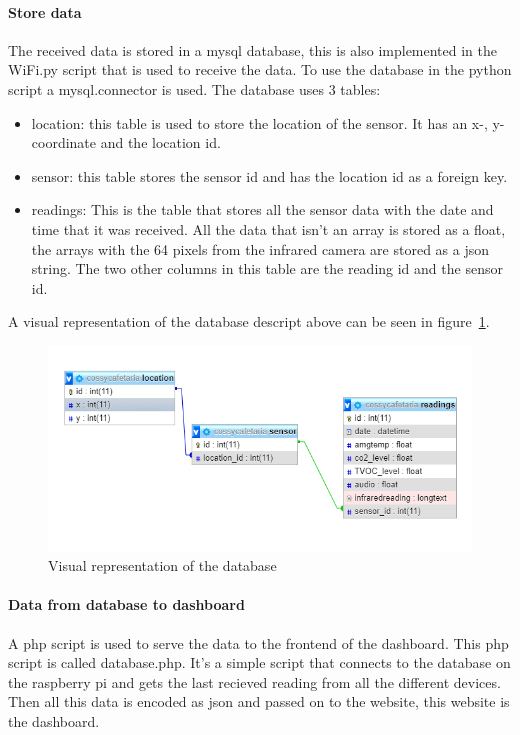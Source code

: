 \documentclass[11pt,a4paper]{article}
\begin{document}
\paragraph{Store data}
The received data is stored in a mysql database, this is also implemented in the WiFi.py script that is used to receive the data.
To use the database in the python script a mysql.connector is used.
The database uses 3 tables: 
\begin{itemize}
	\item location: this table is used to store the location of the sensor. It has an x-, y-coordinate and the location id.
	\item sensor: this table stores the sensor id  and has the location id as a foreign key.
	\item readings: This is the table that stores all the sensor data with the date and time that it was received. 
					All the data that isn't an array is stored as a float, the arrays with the 64 pixels from the infrared camera are stored as a json string.
					The two other columns in this table are the reading id and the sensor id.  
\end{itemize}
A visual representation of the database descript above can be seen in figure~\ref{fig:db_des}.

\begin{figure}[H]
	\centering
	\includegraphics[width=1.0\linewidth]{databaseDesign.png}
	\caption{Visual representation of the database}
	\label{fig:db_des}
\end{figure}

\paragraph{Data from database to dashboard}
A php script is used to serve the data to the frontend of the dashboard. This php script is called database.php. 
It's a simple script that connects to the database on the raspberry pi and gets the last recieved reading from all the different devices.
Then all this data is encoded as json and passed on to the website, this website is the dashboard. 
\end{document}
